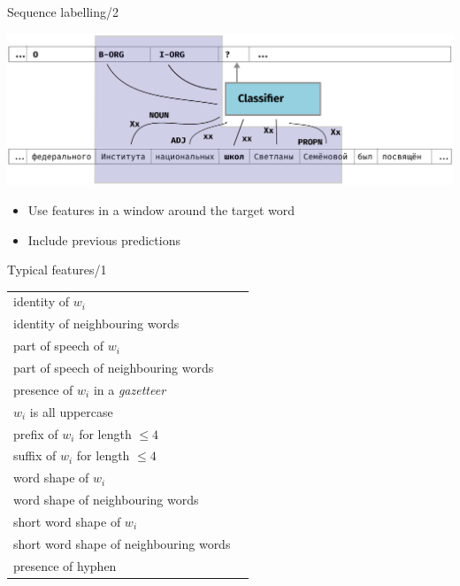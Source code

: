 \documentclass[10pt, compress]{beamer}
\begin{document}
\begin{frame}{Sequence labelling/2}
\begin{center}
  \includegraphics[width=\textwidth]{graphics/classifier.eps}
\end{center}
\begin{itemize}
  \item Use features in a window around the target word
  \item Include previous predictions
\end{itemize} 
\end{frame}





\begin{frame}{Typical features/1}

\begin{tabular}{ll}
identity of $w_i$  &  \\
identity of neighbouring words  &  \\
part of speech of $w_i$  &  \\
part of speech of neighbouring words  &  \\
presence of $w_i$ in a \emph{gazetteer} &  \\
$w_i$ is all uppercase &  \\
prefix of $w_i$ for length $\le 4$ &  \\
suffix of $w_i$ for length $\le 4$ &  \\
word shape of $w_i$ &  \\
word shape of neighbouring words &  \\
short word shape of $w_i$ \\
short word shape of neighbouring words &  \\
presence of hyphen &  \\

\end{tabular}

\end{frame}
\end{document}
